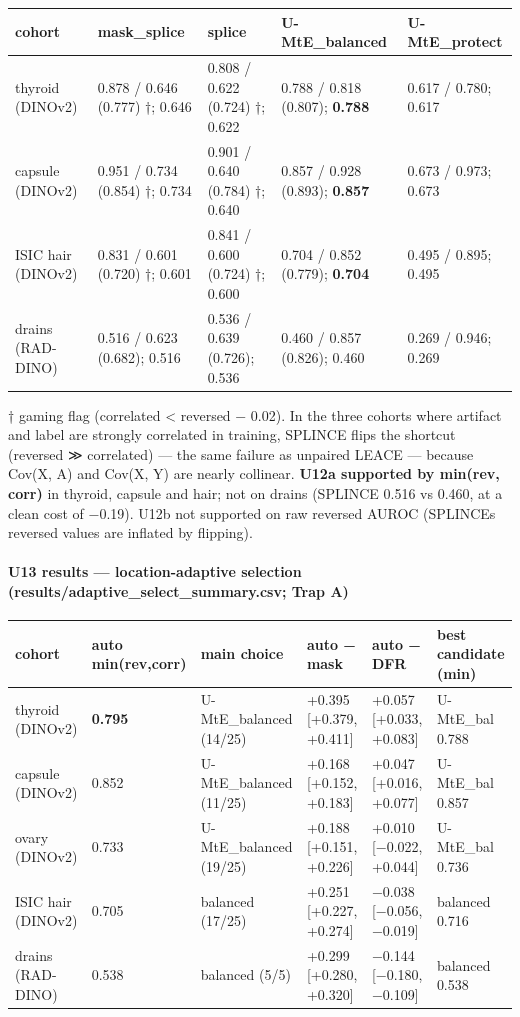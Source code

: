 {{ %
\begin{longtable}[]{@{}lllll@{}}
\toprule\noalign{}
cohort & mask\_splice & splice & U-MtE\_balanced & U-MtE\_protect \\
\midrule\noalign{}
\endhead
\bottomrule\noalign{}
\endlastfoot
thyroid (DINOv2) & 0.878 / 0.646 (0.777) †; 0.646 & 0.808 / 0.622 (0.724) †; 0.622 & 0.788 / 0.818 (0.807); \textbf{0.788} & 0.617 / 0.780; 0.617 \\
capsule (DINOv2) & 0.951 / 0.734 (0.854) †; 0.734 & 0.901 / 0.640 (0.784) †; 0.640 & 0.857 / 0.928 (0.893); \textbf{0.857} & 0.673 / 0.973; 0.673 \\
ISIC hair (DINOv2) & 0.831 / 0.601 (0.720) †; 0.601 & 0.841 / 0.600 (0.724) †; 0.600 & 0.704 / 0.852 (0.779); \textbf{0.704} & 0.495 / 0.895; 0.495 \\
drains (RAD-DINO) & 0.516 / 0.623 (0.682); 0.516 & 0.536 / 0.639 (0.726); 0.536 & 0.460 / 0.857 (0.826); 0.460 & 0.269 / 0.946; 0.269 \\
\end{longtable}
}

† gaming flag (correlated \textless{} reversed − 0.02). In the three cohorts where artifact and label are strongly correlated
in training, SPLINCE flips the shortcut (reversed ≫ correlated) --- the same failure as unpaired LEACE --- because
Cov(X, A) and Cov(X, Y) are nearly collinear. \textbf{U12a supported by min(rev, corr)} in thyroid, capsule and hair;
not on drains (SPLINCE 0.516 vs 0.460, at a clean cost of −0.19). U12b not supported on raw reversed AUROC (SPLINCE\textquotesingle s
reversed values are inflated by flipping).

\paragraph{U13 results --- location-adaptive selection (results/adaptive\_select\_summary.csv; Trap A)}\label{u13-results--location-adaptive-selection-resultsadaptive_select_summarycsv-trap-a}

{ %
\begin{longtable}[]{@{}llllll@{}}
\toprule\noalign{}
cohort & auto min(rev,corr) & main choice & auto − mask & auto − DFR & best candidate (min) \\
\midrule\noalign{}
\endhead
\bottomrule\noalign{}
\endlastfoot
thyroid (DINOv2) & \textbf{0.795} & U-MtE\_balanced (14/25) & +0.395 {[}+0.379, +0.411{]} & +0.057 {[}+0.033, +0.083{]} & U-MtE\_bal 0.788 \\
capsule (DINOv2) & 0.852 & U-MtE\_balanced (11/25) & +0.168 {[}+0.152, +0.183{]} & +0.047 {[}+0.016, +0.077{]} & U-MtE\_bal 0.857 \\
ovary (DINOv2) & 0.733 & U-MtE\_balanced (19/25) & +0.188 {[}+0.151, +0.226{]} & +0.010 {[}−0.022, +0.044{]} & U-MtE\_bal 0.736 \\
ISIC hair (DINOv2) & 0.705 & balanced (17/25) & +0.251 {[}+0.227, +0.274{]} & −0.038 {[}−0.056, −0.019{]} & balanced 0.716 \\
drains (RAD-DINO) & 0.538 & balanced (5/5) & +0.299 {[}+0.280, +0.320{]} & −0.144 {[}−0.180, −0.109{]} & balanced 0.538 \\
\end{longtable}
}

}
